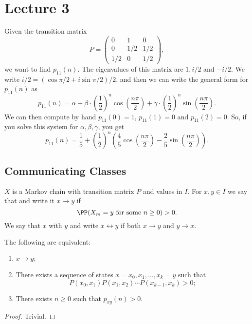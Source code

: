 \documentclass[a4paper]{scrartcl}
\begin{document}
\section{Lecture 3}

\begin{example}
	Given the transition matrix
	$$
	P = \begin{pmatrix}
		0 & 1 & 0 \\
		0 & 1/2 & 1/2 \\ 
		1/2 & 0 & 1/2
	\end{pmatrix},
	$$
	we want to find $p_{11}(n)$. The eigenvalues of this matrix are $1, i/2$ and $-i/2$. We write $i/2 = (\cos \pi/2 + i \sin \pi/2)/2$, and then we can write the general form for $p_{11}(n)$ as
	$$
	p_{11}(n) = \alpha + \beta \cdot \left(\frac{1}{2}\right)^n \cos \left(\frac{n \pi}{2}\right) + \gamma \cdot \left(\frac{1}{2}\right)^n \sin\left(\frac{n \pi}{2}\right).
	$$
	We can then compute by hand $p_{11}(0) = 1$, $p_{11}(1) = 0$ and $p_{11}(2) = 0$. So, if you solve this system for $\alpha, \beta, \gamma$, you get
	$$
	p_{11}(n) = \frac{1}{5} + \left(\frac{1}{2}\right)^n \left(\frac{4}{5}\cos\left(\frac{n \pi}{2}\right) - \frac{2}{5} \sin \left(\frac{n \pi}{2}\right)\right).
	$$
\end{example}

\subsection{Communicating Classes}

\begin{definition}
$X$ is a Markov chain with transition matrix $P$ and values in $I$. For $x, y \in I$ we say that  and write it $x \rightarrow y$ if
$$
\PP(X_m = y \text{ for some }n \geq 0) > 0. 
$$
We say that $x$  with $y$ and write $x \longleftrightarrow y$ if both $x \rightarrow y$ and $y \rightarrow x$.  
\end{definition}

\begin{theorem}
	The following are equivalent: 
	\begin{enumerate}[label=(\roman*)]
		\item $x \rightarrow y$;
		\item There exists a sequence of states $x = x_0, x_1, \dots, x_k = y$ such that 
		$$P(x_0, x_1)P(x_1, x_2) \cdots P(x_{k - 1}, x_k) > 0;$$
		\item There exists $n \geq 0$ such that $p_{xy}(n) > 0$.
	\end{enumerate}
\end{theorem}
\begin{proof}
	Trivial.
\end{proof}
\end{document}
